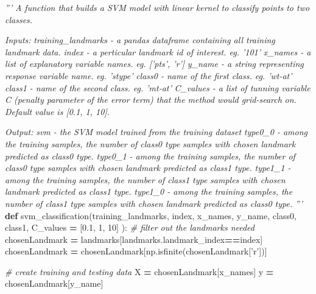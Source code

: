 \documentclass[10pt,letterpaper]{article}
\newenvironment{Shaded}{\begin{snugshade}}{\end{snugshade}}
\newcommand{\KeywordTok}[1]{\textcolor[rgb]{0.13,0.29,0.53}{\textbf{#1}}}
\newcommand{\DecValTok}[1]{\textcolor[rgb]{0.00,0.00,0.81}{#1}}
\newcommand{\FloatTok}[1]{\textcolor[rgb]{0.00,0.00,0.81}{#1}}
\newcommand{\StringTok}[1]{\textcolor[rgb]{0.31,0.60,0.02}{#1}}
\newcommand{\CommentTok}[1]{\textcolor[rgb]{0.56,0.35,0.01}{\textit{#1}}}
\newcommand{\OperatorTok}[1]{\textcolor[rgb]{0.81,0.36,0.00}{\textbf{#1}}}
\newcommand{\NormalTok}[1]{#1}
\begin{document}
\begin{Shaded}
\begin{Highlighting}[]
\CommentTok{'''}
\CommentTok{A function that builds a SVM model with linear kernel to classify points}
\CommentTok{to two classes.}

\CommentTok{Inputs:}
\CommentTok{training_landmarks - a pandas dataframe containing all training landmark}
\CommentTok{                     data.}
\CommentTok{index              - a perticular landmark id of interest. eg. '101'}
\CommentTok{x_names            - a list of explanatory variable names.}
\CommentTok{                     eg. ['pts', 'r']}
\CommentTok{y_name             - a string representing response variable name.}
\CommentTok{                     eg. 'stype'}
\CommentTok{class0             - name of the first class. eg. 'wt-at'}
\CommentTok{class1             - name of the second class. eg. 'mt-at'}
\CommentTok{C_values           - a list of tunning variable C (penalty parameter}
\CommentTok{                     of the error term) that the method would grid-search}
\CommentTok{                     on. Default value is [0.1, 1, 10].}

\CommentTok{Output:}
\CommentTok{svm                - the SVM model trained from the training dataset}
\CommentTok{type0_0            - among the training samples, the number of class0 type}
\CommentTok{                     samples with chosen landmark predicted as class0 type.}
\CommentTok{type0_1            - among the training samples, the number of class0 type}
\CommentTok{                     samples with chosen landmark predicted as class1 type.}
\CommentTok{type1_1            - among the training samples, the number of class1 type}
\CommentTok{                     samples with chosen landmark predicted as class1 type.}
\CommentTok{type1_0            - among the training samples, the number of class1 type}
\CommentTok{                     samples with chosen landmark predicted as class0 type.}
\CommentTok{'''}
\KeywordTok{def}\NormalTok{ svm_classification(training_landmarks, index, x_names, y_name, class0,}
\NormalTok{        class1, C_values }\OperatorTok{=}\NormalTok{ [}\FloatTok{0.1}\NormalTok{, }\DecValTok{1}\NormalTok{, }\DecValTok{10}\NormalTok{] ):}
    \CommentTok{# filter out the landmarks needed}
\NormalTok{    chosenLandmark }\OperatorTok{=}\NormalTok{ landmarks[landmarks.landmark_index}\OperatorTok{==}\NormalTok{index]}
\NormalTok{    chosenLandmark }\OperatorTok{=}\NormalTok{ chosenLandmark[np.isfinite(chosenLandmark[}\StringTok{'r'}\NormalTok{])]}
    
    \CommentTok{# create training and testing data}
\NormalTok{    X }\OperatorTok{=}\NormalTok{ chosenLandmark[x_names]}
\NormalTok{    y }\OperatorTok{=}\NormalTok{ chosenLandmark[y_name]}


\end{Highlighting}
\end{Shaded}
\end{document}
